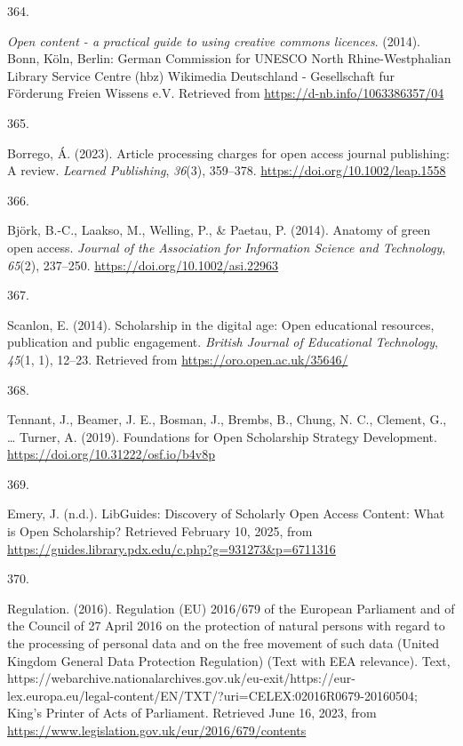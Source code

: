\documentclass[
  11pt,
  letterpaper,
]{scrreprt}
\newlength{\cslhangindent}
\newlength{\csllabelwidth}
\newenvironment{CSLReferences}[2] %
 {\begin{list}{}{%
  \setlength{\itemindent}{0pt}
  \setlength{\leftmargin}{0pt}
  \setlength{\parsep}{0pt}
  \ifodd #1
   \setlength{\leftmargin}{\cslhangindent}
   \setlength{\itemindent}{-1\cslhangindent}
  \fi
  \setlength{\itemsep}{#2\baselineskip}}}
 {\end{list}}
\newcommand{\CSLLeftMargin}[1]{\parbox[t]{\csllabelwidth}{\strut#1\strut}}
\newcommand{\CSLRightInline}[1]{\parbox[t]{\linewidth - \csllabelwidth}{\strut#1\strut}}
\begin{document}
\begin{CSLReferences}{0}{0}
\CSLLeftMargin{364. }%
\CSLRightInline{\emph{Open content - a practical guide to using creative
commons licences}. (2014). Bonn, Köln, Berlin: German Commission for
UNESCO North Rhine-Westphalian Library Service Centre (hbz) Wikimedia
Deutschland - Gesellschaft fur Förderung Freien Wissens e.V. Retrieved
from \url{https://d-nb.info/1063386357/04}}

\CSLLeftMargin{365. }%
\CSLRightInline{Borrego, Á. (2023). Article processing charges for open
access journal publishing: {A} review. \emph{Learned Publishing},
\emph{36}(3), 359--378. \url{https://doi.org/10.1002/leap.1558}}

\CSLLeftMargin{366. }%
\CSLRightInline{Björk, B.-C., Laakso, M., Welling, P., \& Paetau, P.
(2014). Anatomy of green open access. \emph{Journal of the Association
for Information Science and Technology}, \emph{65}(2), 237--250.
\url{https://doi.org/10.1002/asi.22963}}

\CSLLeftMargin{367. }%
\CSLRightInline{Scanlon, E. (2014). Scholarship in the digital age:
{Open} educational resources, publication and public engagement.
\emph{British Journal of Educational Technology}, \emph{45}(1, 1),
12--23. Retrieved from \url{https://oro.open.ac.uk/35646/}}

\CSLLeftMargin{368. }%
\CSLRightInline{Tennant, J., Beamer, J. E., Bosman, J., Brembs, B.,
Chung, N. C., Clement, G., \ldots{} Turner, A. (2019). Foundations for
{Open Scholarship Strategy Development}.
\url{https://doi.org/10.31222/osf.io/b4v8p}}

\CSLLeftMargin{369. }%
\CSLRightInline{Emery, J. (n.d.). {LibGuides}: {Discovery} of {Scholarly
Open Access Content}: {What} is {Open Scholarship}? Retrieved February
10, 2025, from
\url{https://guides.library.pdx.edu/c.php?g=931273&p=6711316}}

\CSLLeftMargin{370. }%
\CSLRightInline{Regulation. (2016). Regulation ({EU}) 2016/679 of the
{European Parliament} and of the {Council} of 27 {April} 2016 on the
protection of natural persons with regard to the processing of personal
data and on the free movement of such data ({United Kingdom General Data
Protection Regulation}) ({Text} with {EEA} relevance). Text,
https://webarchive.nationalarchives.gov.uk/eu-exit/https://eur-lex.europa.eu/legal-content/EN/TXT/?uri=CELEX:02016R0679-20160504;
King's Printer of Acts of Parliament. Retrieved June 16, 2023, from
\url{https://www.legislation.gov.uk/eur/2016/679/contents}}


\end{CSLReferences}
\end{document}
